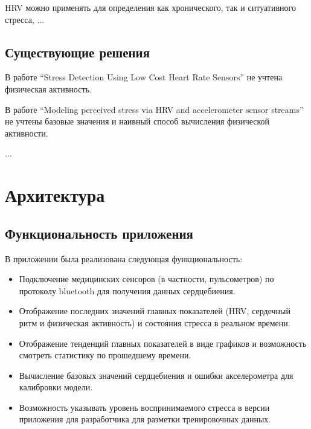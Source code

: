 \documentclass[14pt]{matmex-diploma-custom}
\begin{document}
HRV можно применять для определения как хронического, так и ситуативного
стресса, ...

\subsection{Существующие решения}

В работе ``Stress Detection Using Low Cost Heart Rate Sensors''
\cite{article:cheap_hrm} не учтена физическая активность.

В работе ``Modeling perceived stress via HRV and accelerometer sensor streams''
\cite{article:accelerometer_hrv} не учтены базовые значения и наивный способ
вычисления физической активности.

...

\section{Архитектура}
\subsection{Функциональность приложения}
В приложении была реализована следующая функциональность:
\begin{itemize}
\item Подключение медицинских сенсоров (в частности, пульсометров) по протоколу
  bluetooth для получения данных сердцебиения.
\item Отображение последних значений главных показателей (HRV, сердечный ритм и
  физическая активность) и состояния стресса в реальном времени.
\item Отображение тенденций главных показателей в виде графиков и возможность
  смотреть статистику по прошедшему времени.
\item Вычисление базовых значений сердцебиения и ошибки акселерометра для калибровки модели.
\item Возможность указывать уровень воспринимаемого стресса в версии приложения
  для разработчика для разметки тренировочных данных.
\end{itemize}
\end{document}

